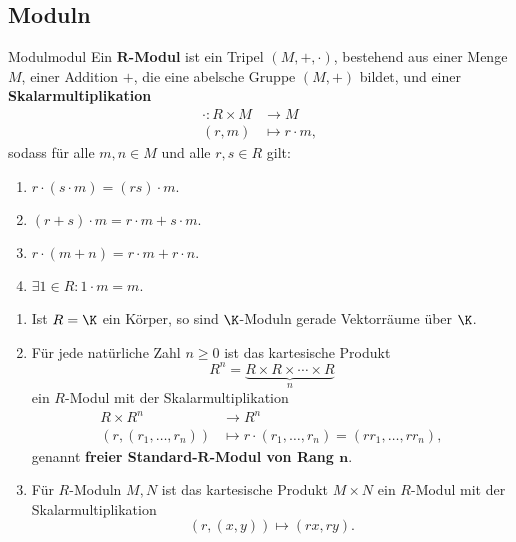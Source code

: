 \subsection{Moduln}
\label{subsec:moduln}

\begin{definition}{Modul}{modul}
Ein $\mathbf{R}$\textbf{-Modul} ist ein Tripel $(M, +, \cdot)$, bestehend aus einer Menge $M$, einer Addition $+$, die eine abelsche Gruppe $(M,+)$ bildet, und einer \textbf{Skalarmultiplikation} 
\begin{equation}
\begin{split}
\cdot: R \times M &\to M\\
(r,m) &\mapsto r \cdot m,
\end{split}
\end{equation}
sodass für alle $m, n \in M$ und alle $r, s \in R$ gilt:
\begin{enumerate}[({M}1)]
\item $r\cdot (s\cdot m) = (rs) \cdot m.$
\item $(r+s)\cdot m = r \cdot m + s \cdot m.$
\item $r \cdot (m+n) = r\cdot m + r \cdot n.$
\item $\exists 1 \in R: 1 \cdot m = m$.
\end{enumerate}
\end{definition}
\begin{beispiele}
\begin{enumerate}
\item Ist $R=\K$ ein Körper, so sind $\K$-Moduln gerade Vektorräume über $\K$.
\item Für jede natürliche Zahl $n\geq 0$ ist das kartesische Produkt 
\begin{equation}
R^n = \underbrace{R \times R \times \cdots \times R}_n
\end{equation}
ein $R$-Modul mit der Skalarmultiplikation
\begin{equation}
\begin{split}
R \times R^n &\to R^n\\
\left( r, (r_1, \dots, r_n) \right) &\mapsto r \cdot (r_1, \dots, r_n) = (rr_1, \dots, rr_n),
\end{split}
\end{equation}
genannt \textbf{freier Standard-$\mathbf{R}$-Modul von Rang $\mathbf{n}$}.
\item Für $R$-Moduln $M,N$ ist das kartesische Produkt $M \times N$ ein $R$-Modul mit der Skalarmultiplikation
\begin{equation}
(r,(x,y)) \mapsto (rx,ry).
\end{equation}
\end{enumerate}
\end{beispiele}
